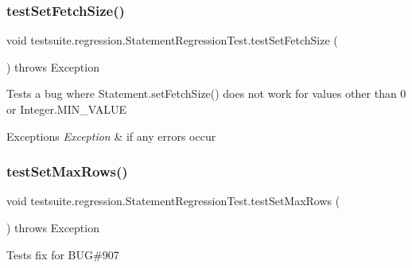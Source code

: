 \subsubsection{\texorpdfstring{test\+Set\+Fetch\+Size()}{testSetFetchSize()}}
{\footnotesize\ttfamily void testsuite.\+regression.\+Statement\+Regression\+Test.\+test\+Set\+Fetch\+Size (\begin{DoxyParamCaption}{ }\end{DoxyParamCaption}) throws Exception}

Tests a bug where Statement.\+set\+Fetch\+Size() does not work for values other than 0 or Integer.\+M\+I\+N\+\_\+\+V\+A\+L\+UE


\begin{DoxyExceptions}{Exceptions}
{\em Exception} & if any errors occur \\
\hline
\end{DoxyExceptions}
\mbox{\label{classtestsuite_1_1regression_1_1_statement_regression_test_a81fe072b5269fee8c61a3391538282c2}} 
\subsubsection{\texorpdfstring{test\+Set\+Max\+Rows()}{testSetMaxRows()}}
{\footnotesize\ttfamily void testsuite.\+regression.\+Statement\+Regression\+Test.\+test\+Set\+Max\+Rows (\begin{DoxyParamCaption}{ }\end{DoxyParamCaption}) throws Exception}

Tests fix for B\+UG\#907


